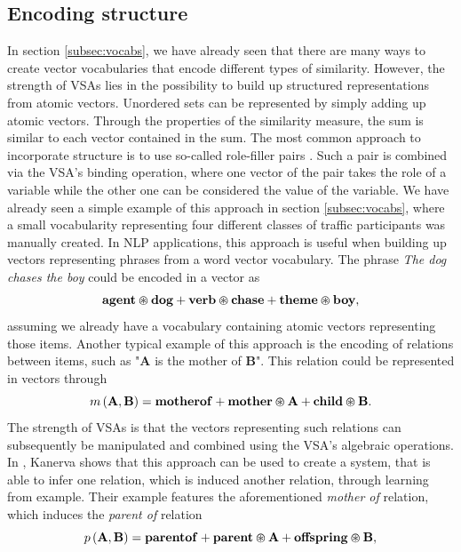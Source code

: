 \subsection{Encoding structure}
\label{subsec:encoding_struct}
In section \ref{subsec:vocabs}, we have already seen that there are many ways to create vector vocabularies that encode different types of similarity.
However, the strength of \acp{VSA} lies in the possibility to build up structured representations from atomic vectors.
Unordered sets can be represented by simply adding up atomic vectors.
Through the properties of the similarity measure, the sum is similar to each vector contained in the sum.
The most common approach to incorporate structure is to use so-called role-filler pairs \cite{Gayler2003}.
Such a pair is combined via the \ac{VSA}'s binding operation, where one vector of the pair takes the role of a variable while the other one can be considered the value of the variable.
We have already seen a simple example of this approach in section \ref{subsec:vocabs}, where a small vocabularity representing four different classes of traffic participants was manually created.
In \ac{NLP} applications, this approach is useful when building up vectors representing phrases from a word vector vocabulary.
The phrase \textit{The dog chases the boy} could be encoded in a vector as
\begin{equation*}
	\mathbf{agent} \varoast \mathbf{dog} + \mathbf{verb} \varoast \mathbf{chase} + \mathbf{theme} \varoast \mathbf{boy},
\end{equation*}
assuming we already have a vocabulary containing atomic vectors representing those items.
Another typical example of this approach is the encoding of relations between items, such as "$\mathbf{A}$ is the mother of $\mathbf{B}$".
This relation could be represented in vectors through
\begin{equation*}
	m \left(\mathbf{A}, \mathbf{B} \right) = \mathbf{motherof} + \mathbf{mother} \varoast \mathbf{A} + \mathbf{child} \varoast \mathbf{B}.
\end{equation*}
The strength of \acp{VSA} is that the vectors representing such relations can subsequently be manipulated and combined using the \ac{VSA}'s algebraic operations.
In \cite{Kanerva2000}, Kanerva shows that this approach can be used to create a system, that is able to infer one relation, which is induced another relation, through learning from example.
Their example features the aforementioned \textit{mother of} relation, which induces the \textit{parent of} relation
\begin{equation*}
	p \left(\mathbf{A}, \mathbf{B} \right) = \mathbf{parentof} + \mathbf{parent} \varoast \mathbf{A} + \mathbf{offspring} \varoast \mathbf{B},
\end{equation*}
